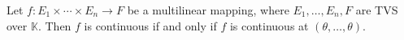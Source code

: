 Let $f: E_1 \times \cdots \times E_n \to F$ be a multilinear mapping, where $E_1, \ldots, E_n, F$ are TVS over $\mathbb{K}$. Then $f$ is continuous if and only if $f$ is continuous at $(\theta, \ldots, \theta)$.
